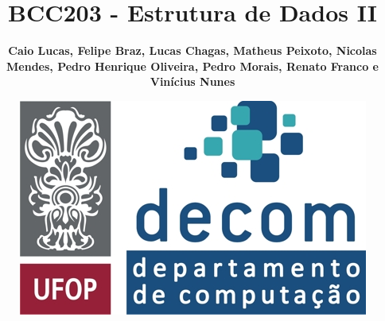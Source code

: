 \author[psilva]{\textbf{Caio Lucas, Felipe Braz, Lucas Chagas, Matheus Peixoto, Nicolas Mendes, Pedro Henrique Oliveira, Pedro Morais, Renato Franco e Vinícius Nunes}}
\title[BCC203]{BCC203 - Estrutura de Dados II}
\date{
\vskip4mm
\includegraphics[scale=0.5]{setup/logos.jpg}
}

\AtBeginSection[]{
    \begin{frame}
        \vfill
        \centering
            \begin{beamercolorbox}[sep=8pt,center,shadow=true,rounded=true]{title}
            \usebeamerfont{title}\insertsectionhead\par%
        \end{beamercolorbox}
        \vfill
    \end{frame}
}

\newcommand{\begindocument}[1]{
  {\setbeamertemplate{footline}{} %
  \begin{frame}[plain]%
    \titlepage
  \end{frame}
  }
  #1
  \begin{frame}{Conteúdo}
    \begin{small}
        \tableofcontents
    \end{small}
  \end{frame}
}

